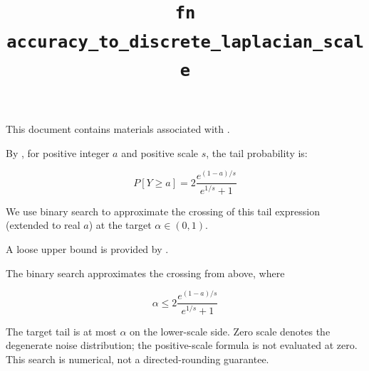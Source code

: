 \documentclass{article}
\title{\texttt{fn accuracy\_to\_discrete\_laplacian\_scale}}
\author{\MichaelShoemateAuthor}
\begin{document}
\maketitle
\contrib

This document contains materials associated with .

By ,
for positive integer $a$ and positive scale $s$, the tail probability is:

\begin{equation*}
    P[Y\ge a] = 2 \frac{e^{(1 - a)/s}}{e^{1/s} + 1}
\end{equation*}

We use binary search to approximate the crossing of this tail expression (extended to real $a$) at the target $\alpha\in(0,1)$.

A loose upper bound is provided by .

The binary search approximates the crossing from above, where

\begin{equation*}
    \alpha \le 2 \frac{e^{(1 - a)/s}}{e^{1/s} + 1}
\end{equation*}

The target tail is at most $\alpha$ on the lower-scale side. Zero scale denotes the degenerate noise distribution; the positive-scale formula is not evaluated at zero. This search is numerical, not a directed-rounding guarantee.
\end{document}
